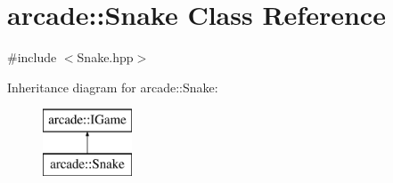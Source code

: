 \hypertarget{classarcade_1_1_snake}{\section{arcade\-:\-:Snake Class Reference}
\label{classarcade_1_1_snake}
}


{\ttfamily \#include $<$Snake.\-hpp$>$}

Inheritance diagram for arcade\-:\-:Snake\-:\begin{figure}[H]
\begin{center}
\leavevmode
\includegraphics[height=2.000000cm]{classarcade_1_1_snake}
\end{center}
\end{figure}
